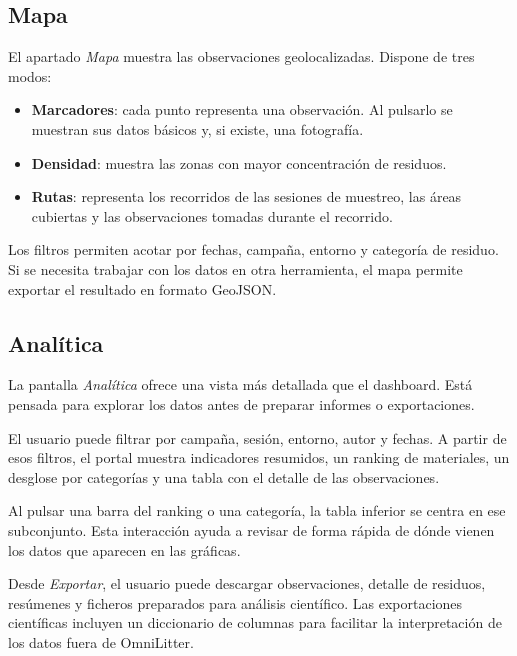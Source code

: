 \subsection{Mapa}

El apartado \textit{Mapa} muestra las observaciones geolocalizadas. Dispone de tres
modos:

\begin{itemize}[leftmargin=1.5em]
  \item \textbf{Marcadores}: cada punto representa una observación. Al pulsarlo se
  muestran sus datos básicos y, si existe, una fotografía.
  \item \textbf{Densidad}: muestra las zonas con mayor concentración de residuos.
  \item \textbf{Rutas}: representa los recorridos de las sesiones de muestreo, las
  áreas cubiertas y las observaciones tomadas durante el recorrido.
\end{itemize}


Los filtros permiten acotar por fechas, campaña, entorno y categoría de residuo. Si
se necesita trabajar con los datos en otra herramienta, el mapa permite exportar el
resultado en formato GeoJSON.

\subsection{Analítica}

La pantalla \textit{Analítica} ofrece una vista más detallada que el dashboard. Está
pensada para explorar los datos antes de preparar informes o exportaciones.


El usuario puede filtrar por campaña, sesión, entorno, autor y fechas. A partir de
esos filtros, el portal muestra indicadores resumidos, un ranking de materiales, un
desglose por categorías y una tabla con el detalle de las observaciones.

Al pulsar una barra del ranking o una categoría, la tabla inferior se centra en ese
subconjunto. Esta interacción ayuda a revisar de forma rápida de dónde vienen los
datos que aparecen en las gráficas.

Desde \textit{Exportar}, el usuario puede descargar observaciones, detalle de
residuos, resúmenes y ficheros preparados para análisis científico. Las exportaciones
científicas incluyen un diccionario de columnas para facilitar la interpretación de
los datos fuera de OmniLitter.

